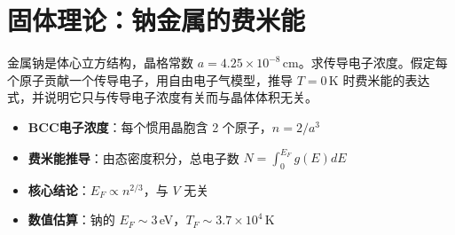 \section{固体理论：钠金属的费米能}
\label{sec:sodium-fermi-energy}

\begin{modelbox}[题目：钠金属传导电子浓度与费米能的计算]
金属钠是体心立方结构，晶格常数 $a=4.25\times10^{-8}\,\text{cm}$。求传导电子浓度。假定每个原子贡献一个传导电子，用自由电子气模型，推导 $T=0\,$K 时费米能的表达式，并说明它只与传导电子浓度有关而与晶体体积无关。
\end{modelbox}

\begin{tipbox}[考点快速分析]
\begin{itemize}
    \item \textbf{BCC电子浓度}：每个惯用晶胞含 2 个原子，$n=2/a^3$
    \item \textbf{费米能推导}：由态密度积分，总电子数 $N=\int_0^{E_F}g(E)dE$
    \item \textbf{核心结论}：$E_F\propto n^{2/3}$，与 $V$ 无关
    \item \textbf{数值估算}：钠的 $E_F\sim3\,$eV，$T_F\sim3.7\times10^4\,$K
\end{itemize}
\end{tipbox}

